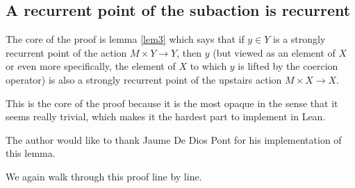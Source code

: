 \documentclass[11pt]{article}
\theoremstyle{definition}              %
\theoremstyle{definition}              %
\theoremstyle{definition}              %
\begin{document}
\subsection{A recurrent point of the subaction is recurrent}
The core of the proof is lemma \ref{lem3} which says that if $y \in Y$ is a strongly recurrent point of the action $M \times Y \to Y$, then $y$ (but viewed as an element of $X$ or even more specifically, the element of $X$ to which $y$ is lifted by the coercion operator) is also a strongly recurrent point of the upstairs action $M \times X \to X$.

This is the core of the proof because it is the most opaque in the sense that it seems really trivial, which makes it the hardest part to implement in Lean.

The author would like to thank Jaume De Dios Pont for his implementation of this lemma.

We again walk through this proof line by line.
\end{document}
